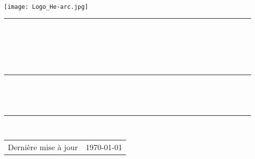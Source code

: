
\begin{titlepage}

\begin{center} 
\hspace{12.45cm}
\texttt{[image: Logo\_He-arc.jpg]}
\end{center}
\vspace{5cm}
\noindent \rule{\linewidth}{1mm}
\begin{center}
\medskip
{\Huge \nomtitre}\\
\bigskip

\begin{minipage}{0.75 \textwidth}
\begin{center}
{\Large \sousTitre}\\
\end{center}
\end{minipage}~\\

\vspace{0.6cm}
\rule{1cm}{0.3mm}\\
\vspace{0.5cm}

\large \auteurs\\
\medskip
\dateCreation

\noindent \rule{\linewidth}{1mm}
\vspace{3cm}



\begin{center}

  \small \ecole \\
  \small \depart
  
\end{center}

\vspace{3.65cm}

\small
{
\begin{tabular}{l@{: }l}
Dernière mise à jour &\today\\
\end{tabular} }

\end{center} 
\end{titlepage}

\newpage
